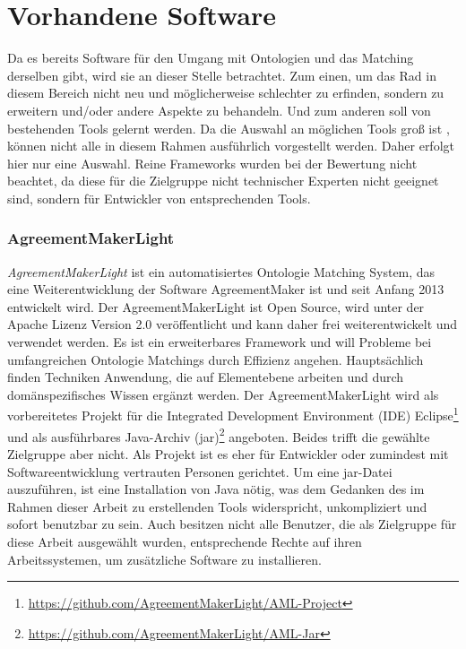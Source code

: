 %
\chapter{Vorhandene Software}
\label{chap:existingSoftware}
		
		Da es bereits Software für den Umgang mit Ontologien und das Matching
		derselben gibt, wird sie an dieser Stelle betrachtet. Zum einen, um das Rad in diesem
		Bereich nicht neu und möglicherweise schlechter zu erfinden, sondern zu
		erweitern und/oder andere Aspekte zu behandeln. Und zum anderen soll von
		bestehenden Tools gelernt werden. Da die Auswahl an möglichen Tools groß ist
		\cite{Ber14}\cite{Shv13}\cite{Eng08}, können nicht alle in diesem Rahmen
		ausführlich vorgestellt werden. Daher erfolgt hier nur eine Auswahl. Reine Frameworks wurden bei der Bewertung nicht beachtet, da diese für die Zielgruppe nicht technischer Experten nicht geeignet sind, sondern für Entwickler von entsprechenden Tools.
		
		\subsection{AgreementMakerLight}
		\textit{AgreementMakerLight} ist ein automatisiertes Ontologie Matching System,
		das eine Weiterentwicklung der Software AgreementMaker ist und seit Anfang 2013 entwickelt wird. Der AgreementMakerLight ist Open Source, wird unter der Apache Lizenz Version 2.0 veröffentlicht und kann daher frei weiterentwickelt und verwendet werden. Es ist ein erweiterbares Framework und will Probleme bei umfangreichen Ontologie Matchings durch Effizienz angehen. Hauptsächlich finden Techniken Anwendung, die auf Elementebene arbeiten und durch domänspezifisches Wissen ergänzt werden.
		Der AgreementMakerLight wird als vorbereitetes Projekt für die Integrated
		Development Environment (IDE)
		Eclipse\footnote{\url{https://github.com/AgreementMakerLight/AML-Project}} und
		als ausführbares Java-Archiv
		(jar)\footnote{\url{https://github.com/AgreementMakerLight/AML-Jar}} angeboten. Beides trifft die gewählte Zielgruppe aber nicht.
		Als Projekt ist es eher für Entwickler oder zumindest mit Softwareentwicklung vertrauten
		Personen gerichtet. Um eine jar-Datei auszuführen, ist eine Installation von
		Java nötig, was dem Gedanken des im Rahmen dieser Arbeit zu erstellenden Tools
		widerspricht, unkompliziert und sofort benutzbar zu sein. Auch besitzen nicht
		alle Benutzer, die als Zielgruppe für diese Arbeit ausgewählt wurden,
		entsprechende Rechte auf ihren Arbeitssystemen, um zusätzliche Software zu
		installieren.
		
